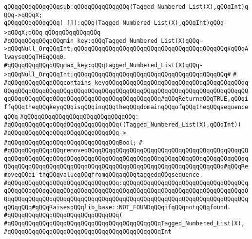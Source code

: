 \newline
\verb|qQQqqQQqqQQqqQQqsub:qQQqqQQqqQQqqQQq(Tagged_Numbered_List(X),qQQqInt)qQQq->qQQqX;|\newline
\verb|qQQqqQQqqQQqqQQq(_[]):qQQq(Tagged_Numbered_List(X),qQQqInt)qQQq->qQQqX;qQQq|\newline
\verb|qQQqqQQqqQQqqQQq|\newline
\newline
\verb|#qQQqqQQqqQQqqQQqmin_key:qQQqTagged_Numbered_List(X)qQQq->qQQqNull_OrqQQqInt;qQQqqQQqqQQqqQQqqQQqqQQqqQQqqQQqqQQqqQQqqQQq#qQQqAlwaysqQQqTHEqQQq0.|\newline
\verb|#qQQqqQQqqQQqqQQqmax_key:qQQqTagged_Numbered_List(X)qQQq->qQQqNull_OrqQQqInt;qQQqqQQqqQQqqQQqqQQqqQQqqQQqqQQqqQQqqQQqqQQq#|\newline
\verb|#|\newline
\verb|#qQQqqQQqqQQqqQQqcontains_keyqQQqqQQqqQQqqQQqqQQqqQQqqQQqqQQqqQQqqQQqqQQqqQQqqQQqqQQqqQQqqQQqqQQqqQQqqQQqqQQqqQQqqQQqqQQqqQQqqQQqqQQqqQQqqQQqqQQqqQQqqQQqqQQqqQQqqQQqqQQqqQQqqQQqqQQqqQQq#qQQqReturnqQQqTRUE,qQQqiffqQQqtheqQQqkeyqQQqisqQQqinqQQqtheqQQqdomainqQQqofqQQqtheqQQqsequenceqQQq|\newline
\verb|#qQQqqQQqqQQqqQQqqQQqqQQqqQQqqQQq:|\newline
\verb|#qQQqqQQqqQQqqQQqqQQqqQQqqQQqqQQq((Tagged_Numbered_List(X),qQQqInt))|\newline
\verb|#qQQqqQQqqQQqqQQqqQQqqQQqqQQqqQQq->|\newline
\verb|#qQQqqQQqqQQqqQQqqQQqqQQqqQQqqQQqBool;|\newline
\verb|#|\newline
\verb|#qQQqqQQqqQQqqQQqremoveqQQqqQQqqQQqqQQqqQQqqQQqqQQqqQQqqQQqqQQqqQQqqQQqqQQqqQQqqQQqqQQqqQQqqQQqqQQqqQQqqQQqqQQqqQQqqQQqqQQqqQQqqQQqqQQqqQQqqQQqqQQqqQQqqQQqqQQqqQQqqQQqqQQqqQQqqQQqqQQqqQQqqQQqqQQqqQQqqQQq#qQQqRemoveqQQqi-thqQQqvalueqQQqfromqQQqaqQQqtaggedqQQqsequence.|\newline
\verb|#qQQqqQQqqQQqqQQqqQQqqQQqqQQqqQQq:qQQqqQQqqQQqqQQqqQQqqQQqqQQqqQQqqQQqqQQqqQQqqQQqqQQqqQQqqQQqqQQqqQQqqQQqqQQqqQQqqQQqqQQqqQQqqQQqqQQqqQQqqQQqqQQqqQQqqQQqqQQqqQQqqQQqqQQqqQQqqQQqqQQqqQQqqQQqqQQqqQQqqQQqqQQqqQQqqQQqqQQq#qQQqRaisesqQQqlib_base::NOT_FOUNDqQQqifqQQqnotqQQqfound.|\newline
\verb|#qQQqqQQqqQQqqQQqqQQqqQQqqQQqqQQq(|\newline
\verb|#qQQqqQQqqQQqqQQqqQQqqQQqqQQqqQQqqQQqqQQqqQQqTagged_Numbered_List(X),|\newline
\verb|#qQQqqQQqqQQqqQQqqQQqqQQqqQQqqQQqqQQqqQQqqQQqInt|\newline
